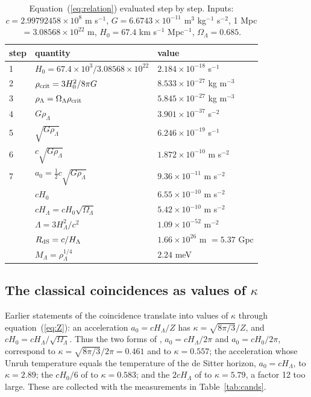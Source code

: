 \documentclass[fleqn,usenatbib]{mnras}
\begin{document}
\begin{table}
\caption{Equation~(\ref{eq:relation}) evaluated step by step. Inputs: $c=2.99792458\times10^{8}$ m s$^{-1}$, $G=6.6743\times10^{-11}$ m$^3$ kg$^{-1}$ s$^{-2}$, 1 Mpc $=3.08568\times10^{22}$ m, $H_0=67.4$ km s$^{-1}$ Mpc$^{-1}$, $\Omega_\Lambda=0.685$.}
\label{tab:inputs}
\begin{tabular}{lll}
\toprule
step & quantity & value\\
\midrule
1 & $H_0=67.4\times10^{3}/3.08568\times10^{22}$ & $2.184\times10^{-18}$ s$^{-1}$\\
2 & $\rho_{\rm crit}=3H_0^2/8\pi G$ & $8.533\times10^{-27}$ kg m$^{-3}$\\
3 & $\rho_\Lambda=\Omega_\Lambda\rho_{\rm crit}$ & $5.845\times10^{-27}$ kg m$^{-3}$\\
4 & $G\rho_\Lambda$ & $3.901\times10^{-37}$ s$^{-2}$\\
5 & $\sqrt{G\rho_\Lambda}$ & $6.246\times10^{-19}$ s$^{-1}$\\
6 & $c\sqrt{G\rho_\Lambda}$ & $1.872\times10^{-10}$ m s$^{-2}$\\
7 & $a_0=\tfrac12c\sqrt{G\rho_\Lambda}$ & $9.36\times10^{-11}$ m s$^{-2}$\\
\midrule
  & $cH_0$ & $6.55\times10^{-10}$ m s$^{-2}$\\
  & $cH_\Lambda=cH_0\sqrt{\Omega_\Lambda}$ & $5.42\times10^{-10}$ m s$^{-2}$\\
  & $\Lambda=3H_\Lambda^2/c^2$ & $1.09\times10^{-52}$ m$^{-2}$\\
  & $R_{\rm dS}=c/H_\Lambda$ & $1.66\times10^{26}$ m $=5.37$ Gpc\\
  & $M_\Lambda=\rho_\Lambda^{1/4}$ & $2.24$ meV\\
\bottomrule
\end{tabular}
\end{table}

\subsection{The classical coincidences as values of $\kappa$}
\label{sec:cands}
Earlier statements of the coincidence translate into values of $\kappa$ through equation~(\ref{eq:Z}): an acceleration $a_0=cH_\Lambda/Z$ has $\kappa=\sqrt{8\pi/3}/Z$, and $cH_0=cH_\Lambda/\sqrt{\Omega_\Lambda}$. Thus the two forms of \citet{Milgrom2020}, $a_0=cH_\Lambda/2\pi$ and $a_0=cH_0/2\pi$, correspond to $\kappa=\sqrt{8\pi/3}/2\pi=0.461$ and to $\kappa=0.557$; the acceleration whose Unruh temperature equals the temperature of the de Sitter horizon, $a_0=cH_\Lambda$, to $\kappa=2.89$; the $cH_0/6$ of \citet{Verlinde2017} to $\kappa=0.583$; and the $2cH_\Lambda$ of \citet{Milgrom1999} to $\kappa=5.79$, a factor 12 too large. These are collected with the measurements in Table~\ref{tab:cands}.
\end{document}
